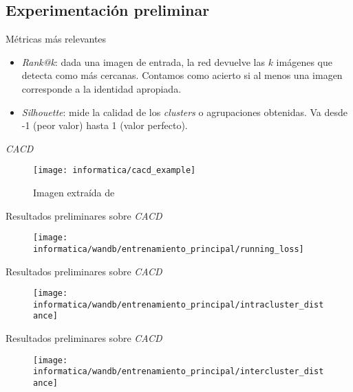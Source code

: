 \subsection{Experimentación preliminar}
\begin{frame}{Métricas más relevantes}
	\begin{itemize}
		\item \textit{Rank@k}: dada una imagen de entrada, la red devuelve las $k$ imágenes que detecta como más cercanas. Contamos como acierto si al menos una imagen corresponde a la identidad apropiada.
		\item \textit{Silhouette}: mide la calidad de los \textit{clusters} o agrupaciones obtenidas. Va desde -1 (peor valor) hasta 1 (valor perfecto).
	\end{itemize}
\end{frame}

\begin{frame}{\textit{CACD}}

	\begin{figure}
		\texttt{[image: informatica/cacd\_example]}
		\caption{Imagen extraída de }
		\label{img:cacd_imagenes_ejemplo}
	\end{figure}

\end{frame}

\begin{frame}{Resultados preliminares sobre \textit{CACD}}
	\begin{figure}
		\texttt{[image: informatica/wandb/entrenamiento\_principal/running\_loss]}
	\end{figure}
\end{frame}

\begin{frame}{Resultados preliminares sobre \textit{CACD}}
	\begin{figure}
		\texttt{[image: informatica/wandb/entrenamiento\_principal/intracluster\_distance]}
	\end{figure}
\end{frame}

\begin{frame}{Resultados preliminares sobre \textit{CACD}}
	\begin{figure}
		\texttt{[image: informatica/wandb/entrenamiento\_principal/intercluster\_distance]}
	\end{figure}

\end{frame}

